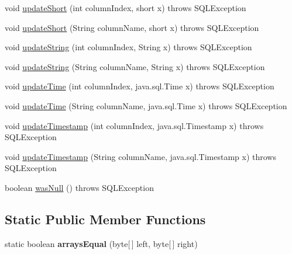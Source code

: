 \begin{DoxyCompactItemize}
void \mbox{\hyperlink{classcom_1_1mysql_1_1jdbc_1_1_result_set_impl_a4856eb4ba75f201ec478c09b5e7af025}{update\+Short}} (int column\+Index, short x)  throws S\+Q\+L\+Exception 
\item 
void \mbox{\hyperlink{classcom_1_1mysql_1_1jdbc_1_1_result_set_impl_a0d4de94cc75212c90c107188c0193456}{update\+Short}} (String column\+Name, short x)  throws S\+Q\+L\+Exception 
\item 
void \mbox{\hyperlink{classcom_1_1mysql_1_1jdbc_1_1_result_set_impl_a2e10fbf310a4ce03868caa68bc786a34}{update\+String}} (int column\+Index, String x)  throws S\+Q\+L\+Exception 
\item 
void \mbox{\hyperlink{classcom_1_1mysql_1_1jdbc_1_1_result_set_impl_afe4296f714f0851ffe460354b4f4a5c0}{update\+String}} (String column\+Name, String x)  throws S\+Q\+L\+Exception 
\item 
void \mbox{\hyperlink{classcom_1_1mysql_1_1jdbc_1_1_result_set_impl_adcae140a9e3948cda8cdbd564ba88ed7}{update\+Time}} (int column\+Index, java.\+sql.\+Time x)  throws S\+Q\+L\+Exception 
\item 
void \mbox{\hyperlink{classcom_1_1mysql_1_1jdbc_1_1_result_set_impl_a8a8d7908d50f7158ffc333b118a019eb}{update\+Time}} (String column\+Name, java.\+sql.\+Time x)  throws S\+Q\+L\+Exception 
\item 
void \mbox{\hyperlink{classcom_1_1mysql_1_1jdbc_1_1_result_set_impl_a37a19594b5873238ea66b6549024e202}{update\+Timestamp}} (int column\+Index, java.\+sql.\+Timestamp x)  throws S\+Q\+L\+Exception 
\item 
void \mbox{\hyperlink{classcom_1_1mysql_1_1jdbc_1_1_result_set_impl_a7934518ed2f8bbfee20a5b4a5a0cdcd0}{update\+Timestamp}} (String column\+Name, java.\+sql.\+Timestamp x)  throws S\+Q\+L\+Exception 
\item 
boolean \mbox{\hyperlink{classcom_1_1mysql_1_1jdbc_1_1_result_set_impl_a05e363f39a9bfbb27736d2b90df9ae99}{was\+Null}} ()  throws S\+Q\+L\+Exception 
\end{DoxyCompactItemize}
\subsection*{Static Public Member Functions}
\begin{DoxyCompactItemize}
\item 
\mbox{\label{classcom_1_1mysql_1_1jdbc_1_1_result_set_impl_a224525766f61dadf1e75702821882d3d}} 
static boolean {\bfseries arrays\+Equal} (byte\mbox{[}$\,$\mbox{]} left, byte\mbox{[}$\,$\mbox{]} right)
\end{DoxyCompactItemize}
